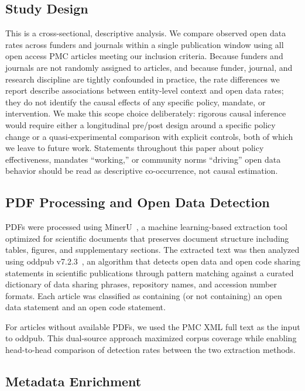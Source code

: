 \subsection{Study Design}

This is a cross-sectional, descriptive analysis. We compare observed open data rates across funders and journals within a single publication window using all open access PMC articles meeting our inclusion criteria. Because funders and journals are not randomly assigned to articles, and because funder, journal, and research discipline are tightly confounded in practice, the rate differences we report describe associations between entity-level context and open data rates; they do not identify the causal effects of any specific policy, mandate, or intervention. We make this scope choice deliberately: rigorous causal inference would require either a longitudinal pre/post design around a specific policy change or a quasi-experimental comparison with explicit controls, both of which we leave to future work. Statements throughout this paper about policy effectiveness, mandates ``working,'' or community norms ``driving'' open data behavior should be read as descriptive co-occurrence, not causal estimation.

\subsection{PDF Processing and Open Data Detection}

PDFs were processed using MinerU~\cite{Wang2024mineru}, a machine learning-based extraction tool optimized for scientific documents that preserves document structure including tables, figures, and supplementary sections. The extracted text was then analyzed using oddpub v7.2.3~\cite{Riedel2020-fk}, an algorithm that detects open data and open code sharing statements in scientific publications through pattern matching against a curated dictionary of data sharing phrases, repository names, and accession number formats. Each article was classified as containing (or not containing) an open data statement and an open code statement.

For articles without available PDFs, we used the PMC XML full text as the input to oddpub. This dual-source approach maximized corpus coverage while enabling head-to-head comparison of detection rates between the two extraction methods.

\subsection{Metadata Enrichment}

